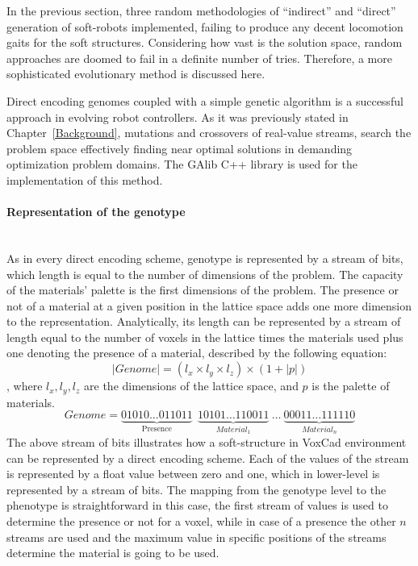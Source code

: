 In the previous section, three random methodologies of ``indirect'' and ``direct'' generation of soft-robots implemented, failing to produce any decent locomotion gaits for the soft structures. Considering how vast is the solution space, random approaches are doomed to fail in a definite number of tries. Therefore, a more sophisticated evolutionary method is discussed here.

Direct encoding genomes coupled with a simple genetic algorithm is a successful approach in evolving robot controllers. As it was previously stated in Chapter~\ref{Background}, mutations and crossovers of real-value streams, search the problem space effectively finding near optimal solutions in demanding optimization problem domains. The GAlib C++ library \citep{wall1996galib} is used for the implementation of this method.

\paragraph*{Representation of the genotype}~\\
As in every direct encoding scheme, genotype is represented by a stream of bits, which length is equal to the number of dimensions of the problem. The capacity of the materials' palette is the first dimensions of the problem. The presence or not of a material at a given position in the lattice space adds one more dimension to the representation. Analytically, its length can be represented by a stream of length equal to the number of voxels in the lattice times the materials used plus one denoting the presence of a material, described by the following equation:
\begin{equation}
\label{lengthDirect}
| Genome | = (l_x \times l_y \times l_z ) \times (1 + |p|)
\end{equation}
, where $l_x, l_y, l_z$ are the dimensions of the lattice space, and $p$ is the palette of materials.
\begin{equation*}
Genome = \underbrace{01010\ldots011011}_\text{Presence}\ \    \underbrace{10101\ldots110011}_{Material_1} \   \ldots\  \underbrace{00011\ldots111110}_{Material_n}
\end{equation*}
The above stream of bits illustrates how a soft-structure in VoxCad environment can be represented by a direct encoding scheme. Each of the values of the stream is represented by a float value between zero and one, which in lower-level is represented by a stream of bits. The mapping from the genotype level to the phenotype is straightforward in this case, the first stream of values is used to determine the presence or not for a voxel, while in case of a presence the other $n$ streams are used and the maximum value in specific positions of the streams determine the material is going to be used.

